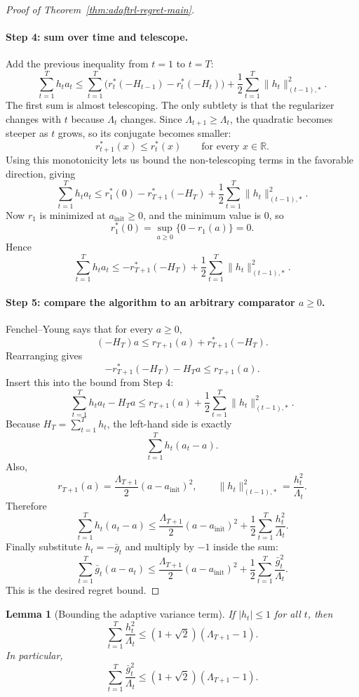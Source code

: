 \documentclass[11pt]{article}
\newtheorem{lemma}{Lemma}
\newcommand{\R}{\mathbb{R}}
\newcommand{\1}{\mathbf{1}}
\begin{document}
\begin{proof}[Proof of Theorem~\ref{thm:adaftrl-regret-main}]
\paragraph{Step 4: sum over time and telescope.}
Add the previous inequality from $t=1$ to $t=T$:
\[
\sum_{t=1}^T h_t a_t
\le
\sum_{t=1}^T\bigl(r_t^*(-H_{t-1})-r_t^*(-H_t)\bigr)
+\frac12\sum_{t=1}^T \|h_t\|_{(t-1),*}^2.
\]
The first sum is almost telescoping. The only subtlety is that the regularizer changes with $t$ because $\Lambda_t$ changes. Since $\Lambda_{t+1}\ge \Lambda_t$, the quadratic becomes steeper as $t$ grows, so its conjugate becomes smaller:
\[
r_{t+1}^*(x)\le r_t^*(x)
\qquad\text{for every }x\in\R.
\]
Using this monotonicity lets us bound the non-telescoping terms in the favorable direction, giving
\[
\sum_{t=1}^T h_t a_t
\le
r_1^*(0)-r_{T+1}^*(-H_T)+\frac12\sum_{t=1}^T \|h_t\|_{(t-1),*}^2.
\]
Now $r_1$ is minimized at $a_{\mathrm{init}}\ge 0$, and the minimum value is $0$, so
\[
r_1^*(0)=\sup_{a\ge 0}\{0-r_1(a)\}=0.
\]
Hence
\[
\sum_{t=1}^T h_t a_t
\le
-r_{T+1}^*(-H_T)+\frac12\sum_{t=1}^T \|h_t\|_{(t-1),*}^2.
\]

\paragraph{Step 5: compare the algorithm to an arbitrary comparator $a\ge 0$.}
Fenchel--Young says that for every $a\ge 0$,
\[
(-H_T)a\le r_{T+1}(a)+r_{T+1}^*(-H_T).
\]
Rearranging gives
\[
-r_{T+1}^*(-H_T)-H_Ta\le r_{T+1}(a).
\]
Insert this into the bound from Step 4:
\[
\sum_{t=1}^T h_t a_t-H_Ta
\le
r_{T+1}(a)+\frac12\sum_{t=1}^T \|h_t\|_{(t-1),*}^2.
\]
Because $H_T=\sum_{t=1}^T h_t$, the left-hand side is exactly
\[
\sum_{t=1}^T h_t(a_t-a).
\]
Also,
\[
r_{T+1}(a)=\frac{\Lambda_{T+1}}{2}(a-a_{\mathrm{init}})^2,
\qquad
\|h_t\|_{(t-1),*}^2=\frac{h_t^2}{\Lambda_t}.
\]
Therefore
\[
\sum_{t=1}^T h_t(a_t-a)
\le
\frac{\Lambda_{T+1}}{2}(a-a_{\mathrm{init}})^2+\frac12\sum_{t=1}^T \frac{h_t^2}{\Lambda_t}.
\]
Finally substitute $h_t=-\bar g_t$ and multiply by $-1$ inside the sum:
\[
\sum_{t=1}^T \bar g_t(a-a_t)
\le
\frac{\Lambda_{T+1}}{2}(a-a_{\mathrm{init}})^2+\frac12\sum_{t=1}^T \frac{\bar g_t^2}{\Lambda_t}.
\]
This is the desired regret bound.
\end{proof}

\begin{lemma}[Bounding the adaptive variance term]
\label{lem:app-adaptive-sum}
If \( |h_t|\le 1 \) for all \(t\), then
\[
\sum_{t=1}^T \frac{h_t^2}{\Lambda_t} \le (1+\sqrt{2})(\Lambda_{T+1}-1).
\]
In particular,
\[
\sum_{t=1}^T \frac{\bar g_t^2}{\Lambda_t} \le (1+\sqrt{2})(\Lambda_{T+1}-1).
\]
\end{lemma}
\end{document}
